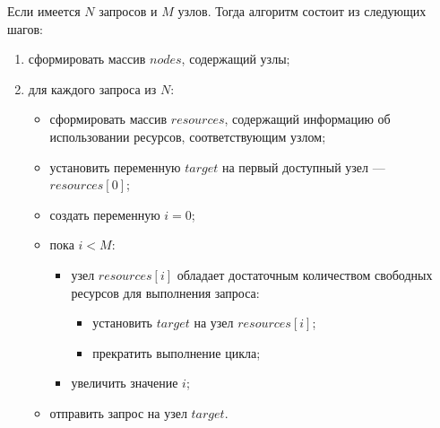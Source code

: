 Если имеется $N$ запросов и $M$ узлов. Тогда алгоритм состоит из следующих шагов:
\begin{enumerate}
	\item сформировать массив $nodes$, содержащий узлы;
	\item для каждого запроса из $N$:
	\begin{itemize}
		\item сформировать массив $resources$, содержащий информацию об использовании ресурсов, соответствующим узлом;
		\item установить переменную $target$ на первый доступный узел --- $resources[0]$;
		\item создать переменную $i = 0$;
		\item пока $i < M$:
		\begin{itemize}
			\item узел $resources[i]$ обладает достаточным количеством свободных ресурсов для выполнения запроса:
			\begin{itemize}
				\item установить $target$ на узел $resources[i]$; 
				\item прекратить выполнение цикла;
			\end{itemize}
			\item увеличить значение $i$;
		\end{itemize}
		\item отправить запрос на узел $target$.
	\end{itemize}
\end{enumerate}